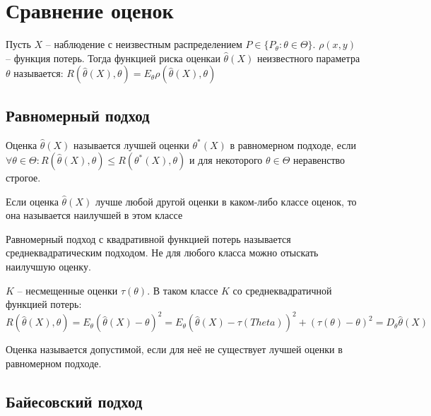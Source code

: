 \documentclass[document.tex]{subfiles}
\begin{document}
\section{Сравнение оценок}
\begin{definition}
    Пусть $X$ -- наблюдение с неизвестным распределением $P \in \{P_{\theta}: \theta \in \Theta\}$. $\rho(x, y)$ --
    функция потерь. Тогда функцией риска оценкаи $\hat \theta(X)$ неизвестного параметра $\theta$ называется:
    $R(\hat \theta(X), \theta) = E_{\theta} \rho(\hat \theta(X), \theta)$
\end{definition}

\subsection{Равномерный подход}

\begin{definition}
    Оценка $\hat \theta(X)$ называется лучшей оценки $\theta^*(X)$ в равномерном подходе, если $\forall \theta \in
    \Theta: R(\hat \theta(X), \theta) \leq R(\theta^*(X), \theta)$ и для некоторого $\theta \in \Theta$ неравенство
    строгое.
\end{definition}

\begin{definition}
    Если оценка $\hat \theta(X)$ лучше любой другой оценки в каком-либо классе оценок, то она называется наилучшей в
    этом классе
\end{definition}

\begin{remark}
    Равномерный подход с квадративной функцией потерь называется среднеквадратическим подходом. Не для любого класса
    можно отыскать наилучшую оценку.
\end{remark}

\begin{definition}
    $K$ -- несмещенные оценки $\tau(\theta)$. В таком классе $K$ со среднеквадратичной функцией потерь:
    \[
        R(\hat \theta(X), \theta) = E_{\theta} (\hat \theta(X) - \theta)^2 = E_{\theta} (\hat \theta(X) - \tau(Theta))^2
        + (\tau(\theta) - \theta)^2 = D_{\theta} \hat \theta(X)
    \]
\end{definition}

\begin{definition}
    Оценка называется допустимой, если для неё не существует лучшей оценки в равномерном подходе.
\end{definition}

\subsection{Байесовский подход}
\end{document}
